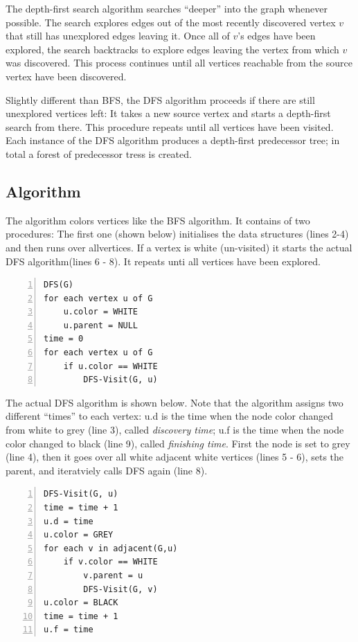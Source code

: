 
The depth-first search algorithm searches ``deeper'' into the graph whenever possible. The search explores edges out of the most recently discovered vertex $v$ that still has unexplored edges leaving it. Once all of $v$'s edges have been explored, the search backtracks to explore edges leaving the vertex from which $v$ was discovered. This process continues until all vertices reachable from the source vertex have been discovered.

Slightly different than BFS, the DFS algorithm proceeds if there are still unexplored vertices left: It takes a new source vertex and starts a depth-first search from there. This procedure repeats until all vertices have been visited. Each instance of the DFS algorithm produces a depth-first predecessor tree; in total a forest of predecessor tress is created.

\subsection{Algorithm}

The algorithm colors vertices like the BFS algorithm. It contains of two procedures: The first one (shown below) initialises the data structures (lines 2-4) and then runs over allvertices. If a vertex is white (un-visited) it starts the actual DFS algorithm(lines 6 - 8). It repeats unti all vertices have been explored.

\begin{Verbatim}[numbers=left, xleftmargin=5mm]
DFS(G)
for each vertex u of G
    u.color = WHITE
    u.parent = NULL
time = 0
for each vertex u of G
    if u.color == WHITE
        DFS-Visit(G, u)
\end{Verbatim}

The actual DFS algorithm is shown below. Note that the algorithm assigns two different ``times'' to each vertex: u.d is the time when the node color changed from white to grey (line 3), called \emph{discovery time}; u.f is the time when the node color changed to black (line 9), called \emph{finishing time}. First the node is set to grey (line 4), then it goes over all white adjacent white vertices (lines 5 - 6), sets the parent, and iteratviely calls DFS again (line 8).

\begin{Verbatim}[numbers=left, xleftmargin=5mm]
DFS-Visit(G, u)
time = time + 1
u.d = time
u.color = GREY
for each v in adjacent(G,u)
    if v.color == WHITE
        v.parent = u
        DFS-Visit(G, v)
u.color = BLACK
time = time + 1
u.f = time
\end{Verbatim}

